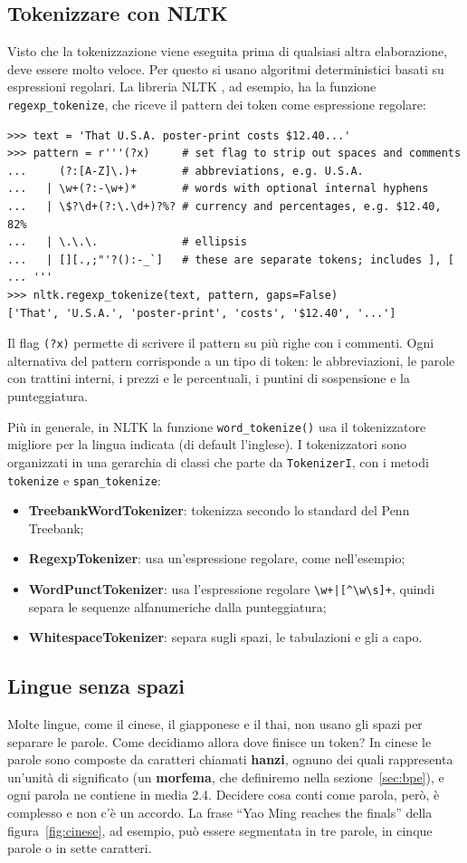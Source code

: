 \subsection{Tokenizzare con NLTK}
Visto che la tokenizzazione viene eseguita prima di qualsiasi altra elaborazione, deve essere molto veloce. Per questo si usano algoritmi deterministici basati su espressioni regolari. La libreria NLTK \cite{bird2009nltk}, ad esempio, ha la funzione \texttt{regexp\_tokenize}, che riceve il pattern dei token come espressione regolare:
\begin{lstlisting}[style=py]
>>> text = 'That U.S.A. poster-print costs $12.40...'
>>> pattern = r'''(?x)     # set flag to strip out spaces and comments
...     (?:[A-Z]\.)+       # abbreviations, e.g. U.S.A.
...   | \w+(?:-\w+)*       # words with optional internal hyphens
...   | \$?\d+(?:\.\d+)?%? # currency and percentages, e.g. $12.40, 82%
...   | \.\.\.             # ellipsis
...   | [][.,;"'?():-_`]   # these are separate tokens; includes ], [
... '''
>>> nltk.regexp_tokenize(text, pattern, gaps=False)
['That', 'U.S.A.', 'poster-print', 'costs', '$12.40', '...']
\end{lstlisting}
Il flag \verb|(?x)| permette di scrivere il pattern su più righe con i commenti. Ogni alternativa del pattern corrisponde a un tipo di token: le abbreviazioni, le parole con trattini interni, i prezzi e le percentuali, i puntini di sospensione e la punteggiatura.

Più in generale, in NLTK la funzione \texttt{word\_tokenize()} usa il tokenizzatore migliore per la lingua indicata (di default l'inglese). I tokenizzatori sono organizzati in una gerarchia di classi che parte da \texttt{TokenizerI}, con i metodi \texttt{tokenize} e \texttt{span\_tokenize}:
\begin{itemize}
    \item \textbf{TreebankWordTokenizer}: tokenizza secondo lo standard del Penn Treebank;
    \item \textbf{RegexpTokenizer}: usa un'espressione regolare, come nell'esempio;
    \item \textbf{WordPunctTokenizer}: usa l'espressione regolare \verb!\w+|[^\w\s]+!, quindi separa le sequenze alfanumeriche dalla punteggiatura;
    \item \textbf{WhitespaceTokenizer}: separa sugli spazi, le tabulazioni e gli a capo.
\end{itemize}

\subsection{Lingue senza spazi}
Molte lingue, come il cinese, il giapponese e il thai, non usano gli spazi per separare le parole. Come decidiamo allora dove finisce un token? In cinese le parole sono composte da caratteri chiamati \textbf{hanzi}, ognuno dei quali rappresenta un'unità di significato (un \textbf{morfema}, che definiremo nella sezione~\ref{sec:bpe}), e ogni parola ne contiene in media 2.4. Decidere cosa conti come parola, però, è complesso e non c'è un accordo. La frase \enquote{Yao Ming reaches the finals} della figura~\ref{fig:cinese}, ad esempio, può essere segmentata in tre parole, in cinque parole o in sette caratteri.

